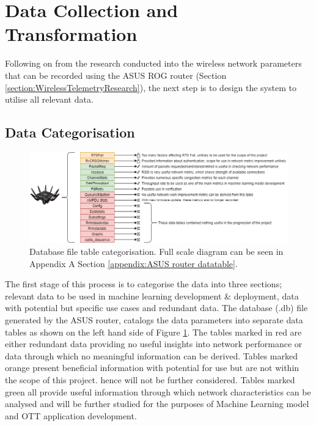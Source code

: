 \section{Data Collection and Transformation}
\label{data_collection_design}

Following on from the research conducted into the wireless network parameters that can be recorded using the ASUS ROG router (Section \ref{section:WirelessTelemetryResearch}), the next step is to design the system to utilise all relevant data. 

\subsection{Data Categorisation}
\label{Section: Data Categorisation}

\begin{figure} [ht]
    \centering
    \includegraphics[width=1\linewidth]{pages/Chapter3/Chapter 3 images/router_data-Datasets-Usefulness.png}
    \caption{Database file table categorisation. Full  scale  diagram  can be seen in Appendix A Section \ref{appendix:ASUS router datatable}.}
    \label{fig_ASUSDatatables}
\end{figure}

The first stage of this process is to categorise the data into three sections; relevant data to be used in machine learning development \& deployment, data with potential but specific use cases and redundant data. The database (.db) file generated by the ASUS router, catalogs the data parameters into separate data tables as shown on the left hand side of Figure \ref{fig_ASUSDatatables}. The tables marked in red are either redundant data providing no useful insights into network performance or data through  which no meaningful information can be derived. Tables marked orange present beneficial information with potential for use but are not within the scope of this project. hence will not be further considered. Tables marked green all provide useful information through which network characteristics can be analysed and will be further studied for the purposes of Machine Learning model and OTT application development.  


